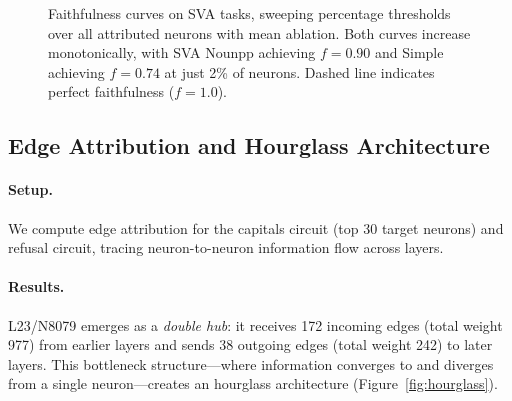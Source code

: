 \documentclass[11pt]{article}
\begin{document}
\begin{figure}[ht]
\centering
{}
\caption{Faithfulness curves on SVA tasks, sweeping percentage thresholds over all attributed neurons with mean ablation. Both curves increase monotonically, with SVA Nounpp achieving $f{=}0.90$ and Simple achieving $f{=}0.74$ at just 2\% of neurons. Dashed line indicates perfect faithfulness ($f{=}1.0$).}
\label{fig:faithfulness}
\end{figure}

\subsection{Edge Attribution and Hourglass Architecture}
\label{sec:edge_results}

\paragraph{Setup.}
We compute edge attribution for the capitals circuit (top 30 target neurons) and refusal circuit, tracing neuron-to-neuron information flow across layers.

\paragraph{Results.}
L23/N8079 emerges as a \emph{double hub}: it receives 172 incoming edges (total weight 977) from earlier layers and sends 38 outgoing edges (total weight 242) to later layers.
This bottleneck structure---where information converges to and diverges from a single neuron---creates an hourglass architecture (Figure~\ref{fig:hourglass}).
\end{document}
